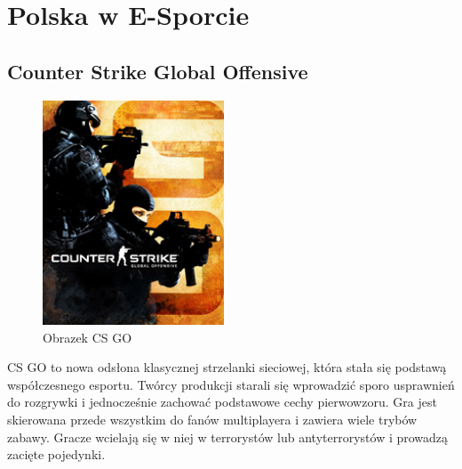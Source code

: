 \documentclass{article}
\begin{document}
\section{Polska w E-Sporcie}
\subsection{Counter Strike Global Offensive}
\begin{figure}
\begin{center}
\vspace{-20pt}
\includegraphics[width=0.48\textwidth]{CS}
\caption[Obrazek CS GO]{Obrazek CS GO}
\label{CS GO}
\end{center}
\vspace{-20pt}
\vspace{-10pt}
\end{figure}
CS GO to nowa odsłona klasycznej strzelanki sieciowej, która stała się podstawą współczesnego esportu. Twórcy produkcji starali się wprowadzić sporo usprawnień do rozgrywki i jednocześnie zachować podstawowe cechy pierwowzoru. Gra jest skierowana przede wszystkim do fanów multiplayera i zawiera wiele trybów zabawy. Gracze wcielają się w niej w terrorystów lub antyterrorystów i prowadzą zacięte pojedynki. 
\end{document}

